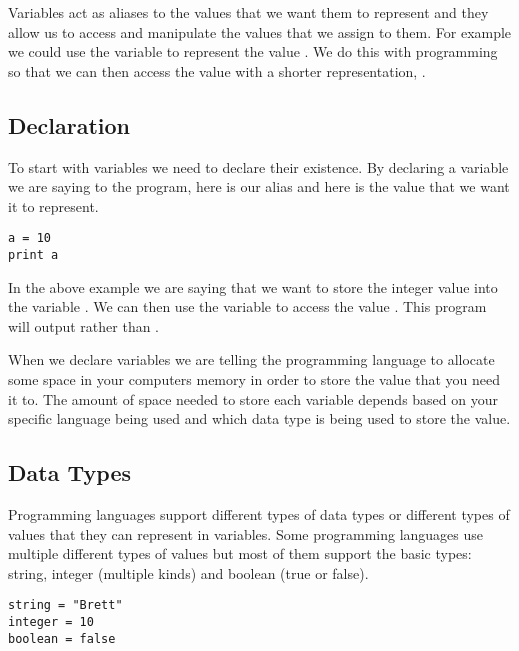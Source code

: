 Variables act as aliases to the values that we want them to represent and they allow us to access and manipulate the
values that we assign to them.
For example we could use the variable  to represent the value .
We do this with programming so that we can then access the value  with a shorter representation, .


\subsection{Declaration}

To start with variables we need to declare their existence.
By declaring a variable we are saying to the program, here is our alias and here is the value that we want it to represent.

\begin{lstlisting}[caption={Variable Declaration}]
a = 10
print a
\end{lstlisting}

In the above example we are saying that we want to store the integer value  into the variable .
We can then use the variable  to access the value .
This program will output  rather than .
\par

When we declare variables we are telling the programming language to allocate some space in your computers memory
in order to store the value that you need it to.
The amount of space needed to store each variable depends based on your specific language being used and which data
type is being used to store the value.



\subsection{Data Types}

Programming languages support different types of data types or different types of values that they can represent in variables.
Some programming languages use multiple different types of values but most of them support the basic types: string, integer (multiple kinds)
and boolean (true or false).

\begin{lstlisting}[caption={Data Types}]
string = "Brett"
integer = 10
boolean = false
\end{lstlisting}

